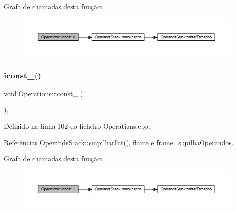 Grafo de chamadas desta função\+:
\nopagebreak
\begin{figure}[H]
\begin{center}
\leavevmode
\includegraphics[width=350pt]{classOperations_a89879486791daebe6659b96688465c9d_cgraph}
\end{center}
\end{figure}
\mbox{\label{classOperations_a3933ba76ead633a53683ff8491a313ea}} 
\subsubsection{\texorpdfstring{iconst\+\_()}{iconst\_1()}}
{\footnotesize\ttfamily void Operations\+::iconst\+\_ (\begin{DoxyParamCaption}{ }\end{DoxyParamCaption})\hspace{0.3cm}{\ttfamily [static]}, {\ttfamily [private]}}



Definido na linha 102 do ficheiro Operations.\+cpp.



Referências Operands\+Stack\+::empilhar\+Int(), flame e frame\+\_\+s\+::pilha\+Operandos.

Grafo de chamadas desta função\+:
\nopagebreak
\begin{figure}[H]
\begin{center}
\leavevmode
\includegraphics[width=350pt]{classOperations_a3933ba76ead633a53683ff8491a313ea_cgraph}
\end{center}
\end{figure}
\mbox{\label{classOperations_af1a4f99f0d99da0a7db7fc926932a3c8}} 
